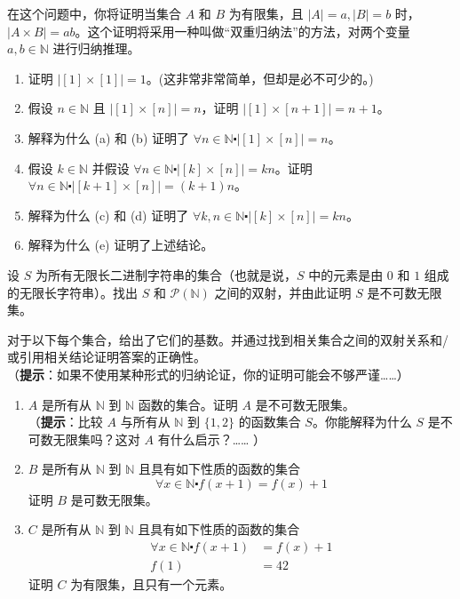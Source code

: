 \begin{exercise}
    在这个问题中，你将证明当集合 $A$ 和 $B$ 为有限集，且 $|A| = a, |B| = b$ 时，$|A \times B| = ab$。这个证明将采用一种叫做``双重归纳法''的方法，对两个变量 $a,b \in \mathbb{N}$ 进行归纳推理。
    \begin{enumerate}[label=(\alph*)]
        \item 证明 $\big|[1] \times [1]\big| = 1$。(这非常非常简单，但却是必不可少的。)
        \item 假设 $n \in \mathbb{N}$ 且 $\big|[1] \times [n]\big| = n$，证明 $\big|[1] \times [n+1]\big| = n+1$。
        \item 解释为什么 (a) 和 (b) 证明了 $\forall n \in \mathbb{N} \centerdot \big|[1] \times [n]\big| = n$。
        \item 假设 $k \in \mathbb{N}$ 并假设 $\forall n \in \mathbb{N} \centerdot \big|[k] \times [n]\big| = kn$。证明 $\forall n \in \mathbb{N} \centerdot \big|[k+1] \times [n]\big| = (k+1)n$。
        \item 解释为什么 (c) 和 (d) 证明了 $\forall k,n \in \mathbb{N} \centerdot \big|[k] \times [n]\big| = kn$。
        \item 解释为什么 (e) 证明了上述结论。
    \end{enumerate}\label{exc:exercises7.8.32}
\end{exercise}

\begin{exercise}
    设 $S$ 为所有无限长二进制字符串的集合（也就是说，$S$ 中的元素是由 $0$ 和 $1$ 组成的无限长字符串）。找出 $S$ 和 $\mathcal{P}(\mathbb{N})$ 之间的双射，并由此证明 $S$ 是不可数无限集。\label{exc:exercises7.8.33}
\end{exercise}

\begin{exercise}
    对于以下每个集合，给出了它们的基数。并通过找到相关集合之间的双射关系和/或引用相关结论证明答案的正确性。\\
    （\textbf{提示}：如果不使用某种形式的归纳论证，你的证明可能会不够严谨……）
    \begin{enumerate}[label=(\alph*)]
        \item $A$ 是所有从 $\mathbb{N}$ 到 $\mathbb{N}$ 函数的集合。证明 $A$ 是不可数无限集。\\
              （\textbf{提示}：比较 $A$ 与所有从 $\mathbb{N}$ 到 $\{1, 2\}$ 的函数集合 $S$。你能解释为什么 $S$ 是不可数无限集吗？这对 $A$ 有什么启示？…… ）
        \item $B$ 是所有从 $\mathbb{N}$ 到 $\mathbb{N}$ 且具有如下性质的函数的集合
              \[\forall x \in \mathbb{N} \centerdot f(x + 1) = f(x) + 1 \]
              证明 $B$ 是可数无限集。
        \item $C$ 是所有从 $\mathbb{N}$ 到 $\mathbb{N}$ 且具有如下性质的函数的集合
              \begin{align*}
                  \forall x \in \mathbb{N} \centerdot f(x + 1) & = f(x) + 1 \\
                  f(1)                                         & = 42
              \end{align*}
              证明 $C$ 为有限集，且只有一个元素。
    \end{enumerate}
\end{exercise}

